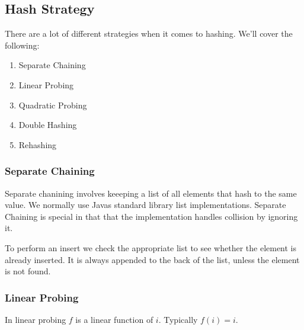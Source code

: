\documentclass[paper=a4, fontsize=11pt]{scrartcl}
\numberwithin{equation}{section} %
\numberwithin{figure}{section} %
\numberwithin{table}{section} %
\theoremstyle{definition}
\begin{document}
\subsection{Hash Strategy}
There are a lot of different strategies when it comes to hashing. We'll cover the following:

\begin{enumerate}
  \item Separate Chaining
  \item Linear Probing
  \item Quadratic Probing
  \item Double Hashing
  \item Rehashing
\end{enumerate}

\subsubsection{Separate Chaining}
Separate chanining involves keeeping a list of all elements that hash to the same value.
We normally use Javas standard library list implementations. Separate Chaining is special in that that
the implementation handles collision by ignoring it. 

To perform an insert we check the appropriate list to see whether the element is already inserted.
It is always appended to the back of the list, unless the element is not found.

\subsubsection{Linear Probing}
In linear probing \(f\) is a linear function of \(i\). Typically \(f\left( i \right) = i\).
\end{document}
